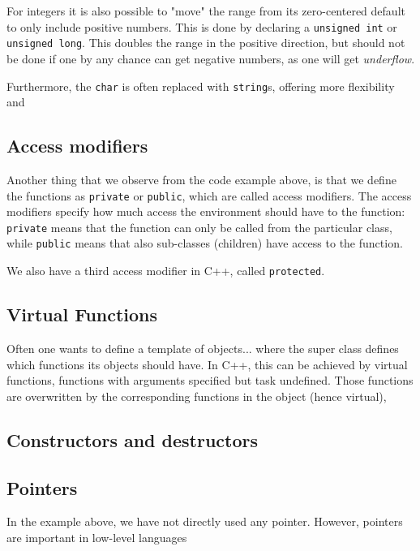 For integers it is also possible to "move" the range from its zero-centered default to only include positive numbers. This is done by declaring a \texttt{unsigned int} or \texttt{unsigned long}. This doubles the range in the positive direction, but should not be done if one by any chance can get negative numbers, as one will get \textit{underflow}. 

Furthermore, the \texttt{char} is often replaced with \texttt{string}s, offering more flexibility and 

\subsection{Access modifiers}
Another thing that we observe from the code example above, is that we define the functions as \texttt{private} or \texttt{public}, which are called access modifiers. The access modifiers specify how much access the environment should have to the function: \texttt{private} means that the function can only be called from the particular class, while \texttt{public} means that also sub-classes (children) have access to the function. 

We also have a third access modifier in C++, called \texttt{protected}. 

\subsection{Virtual Functions}
Often one wants to define a template of objects... where the super class defines which functions its objects should have. In C++, this can be achieved by virtual functions, functions with arguments specified but task undefined. Those functions are overwritten by the corresponding functions in the object (hence virtual), 

\subsection{Constructors and destructors}

\subsection{Pointers}
In the example above, we have not directly used any pointer. However, pointers are important in low-level languages 

